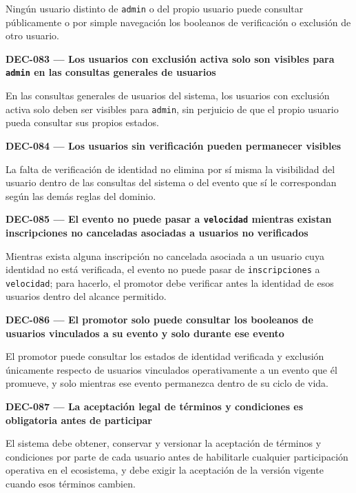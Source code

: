 \documentclass[10pt,letterpaper]{article}
\begin{document}
Ningún usuario distinto de \texttt{admin} o del propio usuario puede consultar públicamente o por simple navegación los booleanos de verificación o exclusión de otro usuario.\par\vspace{0.45em}
\noindent\textbf{DEC-083 --- Los usuarios con exclusión activa solo son visibles para \texttt{admin} en las consultas generales de usuarios}\par
En las consultas generales de usuarios del sistema, los usuarios con exclusión activa solo deben ser visibles para \texttt{admin}, sin perjuicio de que el propio usuario pueda consultar sus propios estados.\par\vspace{0.45em}
\noindent\textbf{DEC-084 --- Los usuarios sin verificación pueden permanecer visibles}\par
La falta de verificación de identidad no elimina por sí misma la visibilidad del usuario dentro de las consultas del sistema o del evento que sí le correspondan según las demás reglas del dominio.\par\vspace{0.45em}
\noindent\textbf{DEC-085 --- El evento no puede pasar a \texttt{velocidad} mientras existan inscripciones no canceladas asociadas a usuarios no verificados}\par
Mientras exista alguna inscripción no cancelada asociada a un usuario cuya identidad no está verificada, el evento no puede pasar de \texttt{inscripciones} a \texttt{velocidad}; para hacerlo, el promotor debe verificar antes la identidad de esos usuarios dentro del alcance permitido.\par\vspace{0.45em}
\noindent\textbf{DEC-086 --- El promotor solo puede consultar los booleanos de usuarios vinculados a su evento y solo durante ese evento}\par
El promotor puede consultar los estados de identidad verificada y exclusión únicamente respecto de usuarios vinculados operativamente a un evento que él promueve, y solo mientras ese evento permanezca dentro de su ciclo de vida.\par\vspace{0.45em}
\noindent\textbf{DEC-087 --- La aceptación legal de términos y condiciones es obligatoria antes de participar}\par
El sistema debe obtener, conservar y versionar la aceptación de términos y condiciones por parte de cada usuario antes de habilitarle cualquier participación operativa en el ecosistema, y debe exigir la aceptación de la versión vigente cuando esos términos cambien.\par\vspace{0.45em}
\end{document}
